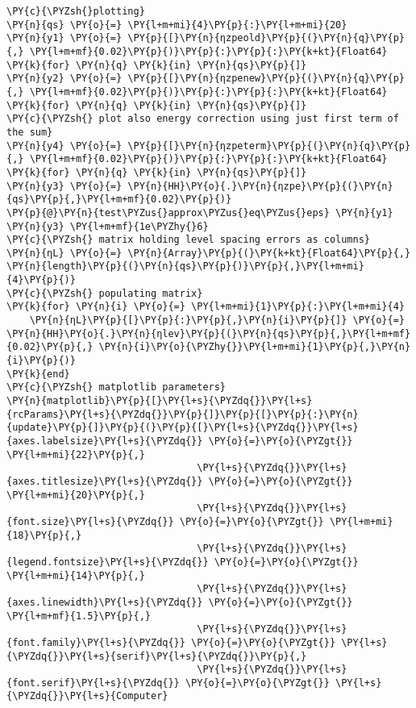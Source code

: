 \begin{Verbatim}[commandchars=\\\{\}]
\PY{c}{\PYZsh{}plotting}
\PY{n}{qs} \PY{o}{=} \PY{l+m+mi}{4}\PY{p}{:}\PY{l+m+mi}{20}
\PY{n}{y1} \PY{o}{=} \PY{p}{[}\PY{n}{ηzpeold}\PY{p}{(}\PY{n}{q}\PY{p}{,} \PY{l+m+mf}{0.02}\PY{p}{)}\PY{p}{:}\PY{p}{:}\PY{k+kt}{Float64} \PY{k}{for} \PY{n}{q} \PY{k}{in} \PY{n}{qs}\PY{p}{]}
\PY{n}{y2} \PY{o}{=} \PY{p}{[}\PY{n}{ηzpenew}\PY{p}{(}\PY{n}{q}\PY{p}{,} \PY{l+m+mf}{0.02}\PY{p}{)}\PY{p}{:}\PY{p}{:}\PY{k+kt}{Float64} \PY{k}{for} \PY{n}{q} \PY{k}{in} \PY{n}{qs}\PY{p}{]}
\PY{c}{\PYZsh{} plot also energy correction using just first term of the sum}
\PY{n}{y4} \PY{o}{=} \PY{p}{[}\PY{n}{ηzpeterm}\PY{p}{(}\PY{n}{q}\PY{p}{,} \PY{l+m+mf}{0.02}\PY{p}{)}\PY{p}{:}\PY{p}{:}\PY{k+kt}{Float64} \PY{k}{for} \PY{n}{q} \PY{k}{in} \PY{n}{qs}\PY{p}{]}
\PY{n}{y3} \PY{o}{=} \PY{n}{HH}\PY{o}{.}\PY{n}{ηzpe}\PY{p}{(}\PY{n}{qs}\PY{p}{,}\PY{l+m+mf}{0.02}\PY{p}{)}
\PY{p}{@}\PY{n}{test\PYZus{}approx\PYZus{}eq\PYZus{}eps} \PY{n}{y1} \PY{n}{y3} \PY{l+m+mf}{1e\PYZhy{}6}
\PY{c}{\PYZsh{} matrix holding level spacing errors as columns}
\PY{n}{ηL} \PY{o}{=} \PY{n}{Array}\PY{p}{(}\PY{k+kt}{Float64}\PY{p}{,} \PY{n}{length}\PY{p}{(}\PY{n}{qs}\PY{p}{)}\PY{p}{,}\PY{l+m+mi}{4}\PY{p}{)}
\PY{c}{\PYZsh{} populating matrix}
\PY{k}{for} \PY{n}{i} \PY{o}{=} \PY{l+m+mi}{1}\PY{p}{:}\PY{l+m+mi}{4}
    \PY{n}{ηL}\PY{p}{[}\PY{p}{:}\PY{p}{,}\PY{n}{i}\PY{p}{]} \PY{o}{=} \PY{n}{HH}\PY{o}{.}\PY{n}{ηlev}\PY{p}{(}\PY{n}{qs}\PY{p}{,}\PY{l+m+mf}{0.02}\PY{p}{,} \PY{n}{i}\PY{o}{\PYZhy{}}\PY{l+m+mi}{1}\PY{p}{,}\PY{n}{i}\PY{p}{)}
\PY{k}{end}
\PY{c}{\PYZsh{} matplotlib parameters}
\PY{n}{matplotlib}\PY{p}{[}\PY{l+s}{\PYZdq{}}\PY{l+s}{rcParams}\PY{l+s}{\PYZdq{}}\PY{p}{]}\PY{p}{[}\PY{p}{:}\PY{n}{update}\PY{p}{]}\PY{p}{(}\PY{p}{[}\PY{l+s}{\PYZdq{}}\PY{l+s}{axes.labelsize}\PY{l+s}{\PYZdq{}} \PY{o}{=}\PY{o}{\PYZgt{}} \PY{l+m+mi}{22}\PY{p}{,}
                                 \PY{l+s}{\PYZdq{}}\PY{l+s}{axes.titlesize}\PY{l+s}{\PYZdq{}} \PY{o}{=}\PY{o}{\PYZgt{}} \PY{l+m+mi}{20}\PY{p}{,}
                                 \PY{l+s}{\PYZdq{}}\PY{l+s}{font.size}\PY{l+s}{\PYZdq{}} \PY{o}{=}\PY{o}{\PYZgt{}} \PY{l+m+mi}{18}\PY{p}{,}
                                 \PY{l+s}{\PYZdq{}}\PY{l+s}{legend.fontsize}\PY{l+s}{\PYZdq{}} \PY{o}{=}\PY{o}{\PYZgt{}} \PY{l+m+mi}{14}\PY{p}{,}
                                 \PY{l+s}{\PYZdq{}}\PY{l+s}{axes.linewidth}\PY{l+s}{\PYZdq{}} \PY{o}{=}\PY{o}{\PYZgt{}} \PY{l+m+mf}{1.5}\PY{p}{,}
                                 \PY{l+s}{\PYZdq{}}\PY{l+s}{font.family}\PY{l+s}{\PYZdq{}} \PY{o}{=}\PY{o}{\PYZgt{}} \PY{l+s}{\PYZdq{}}\PY{l+s}{serif}\PY{l+s}{\PYZdq{}}\PY{p}{,}
                                 \PY{l+s}{\PYZdq{}}\PY{l+s}{font.serif}\PY{l+s}{\PYZdq{}} \PY{o}{=}\PY{o}{\PYZgt{}} \PY{l+s}{\PYZdq{}}\PY{l+s}{Computer}

\end{Verbatim}
